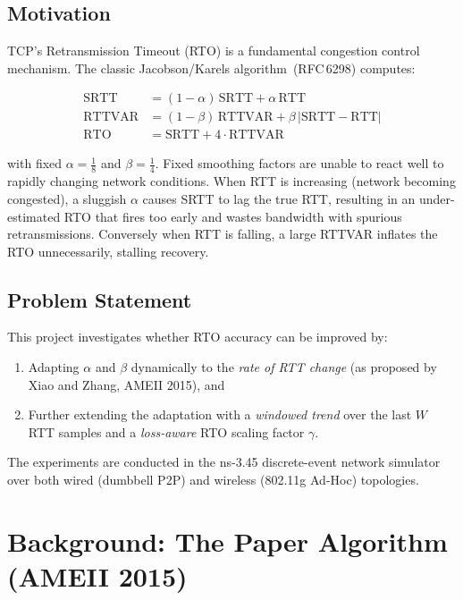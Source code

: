 \documentclass[12pt,a4paper]{report}
\begin{document}
\section{Motivation}

TCP's Retransmission Timeout (RTO) is a fundamental congestion control
mechanism. The classic Jacobson/Karels algorithm~(RFC\,6298) computes:

\begin{align}
  \text{SRTT}   &= (1-\alpha)\,\text{SRTT}   + \alpha\,\text{RTT} \label{eq:srtt} \\
  \text{RTTVAR} &= (1-\beta)\,\text{RTTVAR}  + \beta\,|\text{SRTT} - \text{RTT}| \label{eq:rttvar} \\
  \text{RTO}    &= \text{SRTT} + 4\cdot\text{RTTVAR} \label{eq:rto}
\end{align}

with fixed $\alpha=\tfrac{1}{8}$ and $\beta=\tfrac{1}{4}$.  Fixed smoothing
factors are unable to react well to rapidly changing network conditions.  When
RTT is increasing (network becoming congested), a sluggish $\alpha$ causes
SRTT to lag the true RTT, resulting in an under-estimated RTO that fires too
early and wastes bandwidth with spurious retransmissions.  Conversely when RTT
is falling, a large RTTVAR inflates the RTO unnecessarily, stalling recovery.

\section{Problem Statement}

This project investigates whether RTO accuracy can be improved by:
\begin{enumerate}
  \item Adapting $\alpha$ and $\beta$ dynamically to the \emph{rate of RTT
        change} (as proposed by Xiao and Zhang, AMEII 2015), and
  \item Further extending the adaptation with a \emph{windowed trend} over
        the last $W$ RTT samples and a \emph{loss-aware} RTO scaling factor
        $\gamma$.
\end{enumerate}

The experiments are conducted in the ns-3.45 discrete-event network simulator
over both wired (dumbbell P2P) and wireless (802.11g Ad-Hoc) topologies.

\chapter{Background: The Paper Algorithm (AMEII 2015)}
\label{ch:paper}
\end{document}
